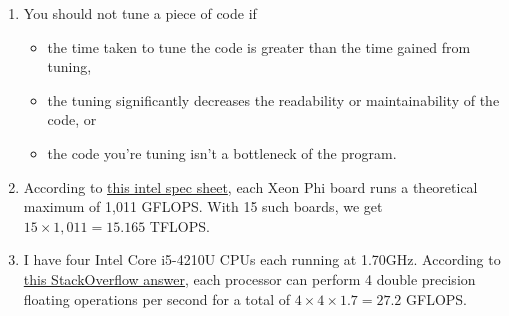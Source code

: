 \documentclass{hw}
\begin{document}
\begin{enumerate}
  \item You should not tune a piece of code if
    \begin{itemize}
      \item the time taken to tune the code is greater than the time gained
        from tuning,
      \item the tuning significantly decreases the readability or
        maintainability of the code, or
      \item the code you're tuning isn't a bottleneck of the program.
    \end{itemize}

  \item According to
    \href{http://www.intel.com/content/www/us/en/benchmarks/server/xeon-phi/xeon-phi-theoretical-maximums.html}{this
    intel spec sheet}, each Xeon Phi board runs a theoretical maximum of 1,011
    GFLOPS. With 15 such boards, we get $15 \times 1,011 = 15.165$ TFLOPS.

  \item
    I have four Intel Core i5-4210U CPUs each running at 1.70GHz. According to
    \href{http://stackoverflow.com/a/15657772/3187068}{this StackOverflow
    answer}, each processor can perform 4 double precision floating operations
    per second for a total of $4 \times 4 \times 1.7 = 27.2$ GFLOPS.
\end{enumerate}
\end{document}
